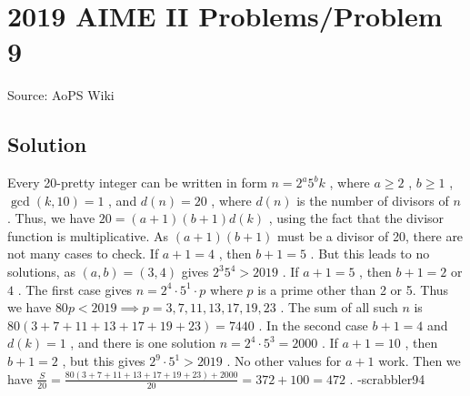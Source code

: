 \documentclass[12pt]{article}
\begin{document}
\section*{{2019 AIME II Problems/Problem 9}}
Source: AoPS Wiki

\subsection*{Solution}
Every 20-pretty integer can be written in form $n = 2^a 5^b k$ , where $a \ge 2$ , $b \ge 1$ , $\gcd(k,10) = 1$ , and $d(n) = 20$ , where $d(n)$ is the number of divisors of $n$ . Thus, we have $20 = (a+1)(b+1)d(k)$ , using the fact that the divisor function is multiplicative. As $(a+1)(b+1)$ must be a divisor of 20, there are not many cases to check. If $a+1 = 4$ , then $b+1 = 5$ . But this leads to no solutions, as $(a,b) = (3,4)$ gives $2^3 5^4 > 2019$ . If $a+1 = 5$ , then $b+1 = 2$ or $4$ . The first case gives $n = 2^4 \cdot 5^1 \cdot p$ where $p$ is a prime other than 2 or 5. Thus we have $80p < 2019 \implies p = 3, 7, 11, 13, 17, 19, 23$ . The sum of all such $n$ is $80(3+7+11+13+17+19+23) = 7440$ . In the second case $b+1 = 4$ and $d(k) = 1$ , and there is one solution $n = 2^4 \cdot 5^3 = 2000$ . If $a+1 = 10$ , then $b+1 = 2$ , but this gives $2^9 \cdot 5^1 > 2019$ . No other values for $a+1$ work. Then we have $\frac{S}{20} = \frac{80(3+7+11+13+17+19+23) + 2000}{20} = 372 + 100 = \boxed{472}$ . -scrabbler94
\end{document}
